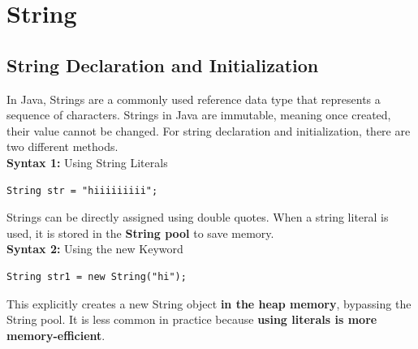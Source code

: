 \documentclass[letterpaper,12pt]{article}
\begin{document}
\section{String}
\subsection{String Declaration and Initialization}
In Java, Strings are a commonly used reference data type that represents a sequence of characters. Strings in Java are immutable, meaning once created, their value cannot be changed. For string declaration and initialization, there are two different methods.\\
\textbf{Syntax 1:} Using String Literals
\begin{verbatim}
String str = "hiiiiiiiii";
\end{verbatim}
Strings can be directly assigned using double quotes. When a string literal is used, it is stored in the \textbf{String pool} to save memory.\\
\textbf{Syntax 2:} Using the new Keyword
\begin{verbatim}
String str1 = new String("hi");
\end{verbatim}
This explicitly creates a new String object \textbf{in the heap memory}, bypassing the String pool. It is less common in practice because \textbf{using literals is more memory-efficient}.
\end{document}
